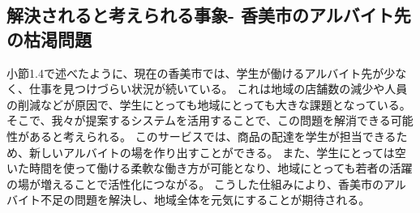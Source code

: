 


\subsection{解決されると考えられる事象- 香美市のアルバイト先の枯渇問題}
小節1.4で述べたように、現在の香美市では、学生が働けるアルバイト先が少なく、仕事を見つけづらい状況が続いている。
これは地域の店舗数の減少や人員の削減などが原因で、学生にとっても地域にとっても大きな課題となっている。
そこで、我々が提案するシステムを活用することで、この問題を解消できる可能性があると考えられる。
このサービスでは、商品の配達を学生が担当できるため、新しいアルバイトの場を作り出すことができる。
また、学生にとっては空いた時間を使って働ける柔軟な働き方が可能となり、地域にとっても若者の活躍の場が増えることで活性化につながる。
こうした仕組みにより、香美市のアルバイト不足の問題を解決し、地域全体を元気にすることが期待される。



